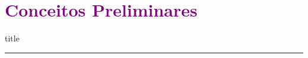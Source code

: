 \documentclass[aspectratio=169]{beamer}
\begin{document}
\section{\textbf{\textcolor{purple}{Conceitos Preliminares}}}
    \begin{frame}[plain]
        \vfill
      \centering
      \begin{beamercolorbox}[sep=8pt,center,shadow=true,rounded=true]{title}
        \insertsectionhead\par%
        \color{oxfordblue}\noindent\rule{10cm}{1pt}
      \end{beamercolorbox}
      \vfill
  \end{frame}
\end{document}
